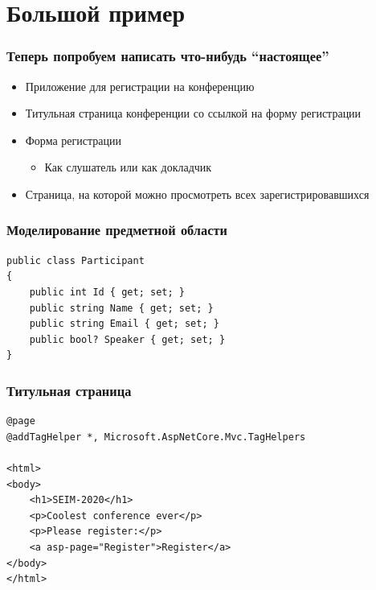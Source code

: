 \documentclass[xetex,mathserif,serif]{beamer}
\begin{document}
	\section{Большой пример}

	\begin{frame}
		\frametitle{Теперь попробуем написать что-нибудь ``настоящее''}
		\begin{itemize}
			\item Приложение для регистрации на конференцию
			\item Титульная страница конференции со ссылкой на форму регистрации
			\item Форма регистрации
			\begin{itemize}
				\item Как слушатель или как докладчик
			\end{itemize}
			\item Страница, на которой можно просмотреть всех зарегистрировавшихся
		\end{itemize}
	\end{frame}

	\begin{frame}[fragile]
		\frametitle{Моделирование предметной области}
		\begin{verbatim}
public class Participant
{
    public int Id { get; set; }
    public string Name { get; set; }
    public string Email { get; set; }
    public bool? Speaker { get; set; }
}
		\end{verbatim}
	\end{frame}

	\begin{frame}[fragile]
		\frametitle{Титульная страница}
		\begin{verbatim}
@page
@addTagHelper *, Microsoft.AspNetCore.Mvc.TagHelpers

<html>
<body>
    <h1>SEIM-2020</h1>
    <p>Coolest conference ever</p>
    <p>Please register:</p>
    <a asp-page="Register">Register</a>
</body>
</html>
		\end{verbatim}
	\end{frame}
\end{document}

